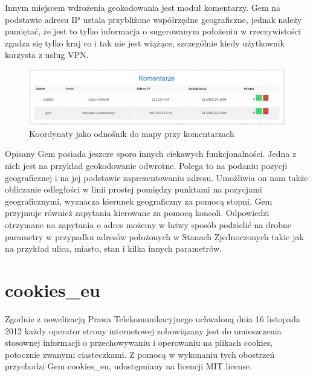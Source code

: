 \documentclass[openright]{xmgr}
\begin{document}
Innym miejscem wdrożenia geokodowania jest moduł komentarzy. Gem na podstawie adresu IP ustala przybliżone współrzędne geograficzne, jednak należy pamiętać, że jest to tylko informacja o sugerowanym położeniu w rzeczywistości zgadza się tylko kraj co i tak nie jest wiążące, szczególnie kiedy użytkownik korzysta z usług VPN.

\begin{figure}[!tbh]
\centering
\includegraphics[width=\linewidth]{fig/geocoder-comments}
\caption{Koordynaty jako odnośnik do mapy przy komentarzach}
\end{figure}

Opisany Gem posiada jeszcze sporo innych ciekawych funkcjonalności. Jedna z nich jest na przykład geokodowanie odwrotne. Polega to na podaniu pozycji geograficznej i na jej podstawie zaprezentowaniu adresu. Umożliwia on nam także obliczanie odległości w linii prostej pomiędzy punktami na pozycjami geograficznymi, wyznacza kierunek geograficzny za pomocą stopni. Gem przyjmuje również zapytania kierowane za pomocą konsoli. Odpowiedzi otrzymane na zapytania o  adres możemy w łatwy sposób podzielić na drobne parametry w przypadku adresów położonych w Stanach Zjednoczonych takie jak na przykład ulica, miasto, stan i kilka innych parametrów.

\newpage

\section{cookies\_eu}
Zgodnie z nowelizacją Prawa Telekomunikacyjnego uchwaloną dnia 16 listopada 2012 każdy operator strony internetowej zobowiązany jest do umieszczenia stosownej informacji o przechowywaniu i operowaniu na plikach cookies, potocznie zwanymi ciasteczkami. Z pomocą w wykonaniu tych obostrzeń przychodzi Gem cookies\_eu\cite{cookies}, udostępniany na licencji MIT license.
\end{document}
